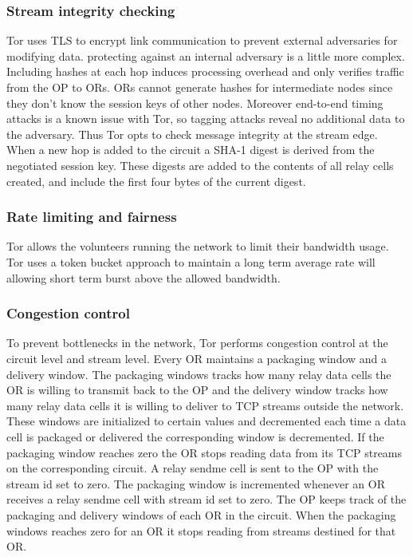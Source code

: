 \documentclass{llncs}
\begin{document}
\subsubsection{Stream integrity checking}
Tor uses TLS to encrypt link communication to prevent external adversaries for modifying data. protecting against an internal adversary is a little more complex. Including hashes at each hop induces processing overhead and only verifies traffic from the OP to ORs. ORs cannot generate hashes for intermediate nodes since they don't know the session keys of other nodes. Moreover end-to-end timing attacks is a known issue with Tor, so tagging attacks reveal no additional data to the adversary.
Thus Tor opts to check message integrity at the stream edge. When a new hop is added to the circuit a SHA-1 digest is derived from the negotiated session key. These digests are added to the contents of all relay cells created, and include the first four bytes of the current digest.

\subsubsection{Rate limiting and fairness}
Tor allows the volunteers running the network to limit their bandwidth usage. Tor uses a token bucket approach to maintain a long term average rate will allowing short term burst above the allowed bandwidth.

\subsubsection{Congestion control}
To prevent bottlenecks in the network, Tor performs congestion control at the circuit level and stream level. Every OR maintains a packaging window and a delivery window. The packaging windows tracks how many relay data cells the OR is willing to transmit back to the OP and the delivery window tracks how many relay data cells it is willing to deliver to TCP streams outside the network. These windows are initialized to certain values and decremented each time a data cell is packaged or delivered the corresponding window is decremented. If the packaging window reaches zero the OR stops reading data from its TCP streams on the corresponding circuit. A relay sendme cell is sent to the OP with the stream id set to zero. The packaging window is incremented whenever an OR receives a relay sendme cell with stream id set to zero.
The OP keeps track of the packaging and delivery windows of each OR in the circuit. When the packaging windows reaches zero for an OR it stops reading from streams destined for that OR.
\end{document}
